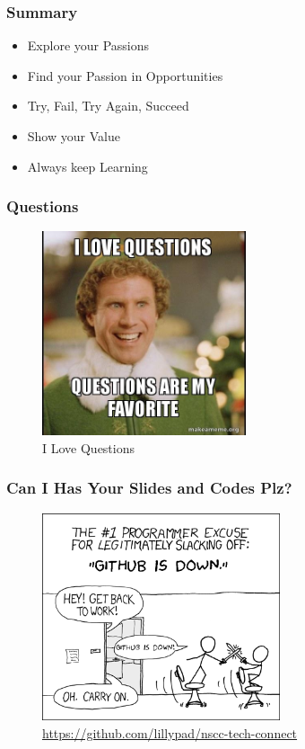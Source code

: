 \documentclass[aspectratio=169]{beamer}
\begin{document}
\begin{frame}
  \frametitle{Summary}
  \begin{itemize}
  \item{Explore your Passions}
  \item{Find your Passion in Opportunities}
  \item{Try, Fail, Try Again, Succeed}
  \item{Show your Value}
  \item{Always keep Learning}
  \end{itemize}
\end{frame}

\begin{frame}
  \frametitle{Questions}
  \begin{center}
    \begin{figure}
      \includegraphics[width=6cm,keepaspectratio]{questions_meme}
      \caption{I Love Questions}
    \end{figure}
  \end{center}
\end{frame}

\begin{frame}
  \frametitle{Can I Has Your Slides and Codes Plz?}
  \begin{center}
    \begin{figure}
      \includegraphics[width=7cm,keepaspectratio]{git_meme}
      \caption{\href{https://github.com/lillypad/nscc-tech-connect}{https://github.com/lillypad/nscc-tech-connect}}
    \end{figure}
  \end{center}
\end{frame}
\end{document}
